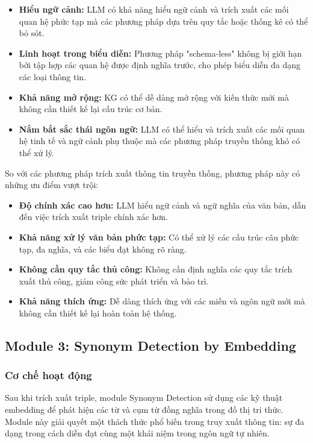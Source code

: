 \begin{itemize}
    \item \textbf{Hiểu ngữ cảnh:} LLM có khả năng hiểu ngữ cảnh và trích xuất các mối quan hệ phức tạp mà các phương pháp dựa trên quy tắc hoặc thống kê có thể bỏ sót.
    
    \item \textbf{Linh hoạt trong biểu diễn:} Phương pháp "schema-less" không bị giới hạn bởi tập hợp các quan hệ được định nghĩa trước, cho phép biểu diễn đa dạng các loại thông tin.
    
    \item \textbf{Khả năng mở rộng:} KG có thể dễ dàng mở rộng với kiến thức mới mà không cần thiết kế lại cấu trúc cơ bản.
    
    \item \textbf{Nắm bắt sắc thái ngôn ngữ:} LLM có thể hiểu và trích xuất các mối quan hệ tinh tế và ngữ cảnh phụ thuộc mà các phương pháp truyền thống khó có thể xử lý.
\end{itemize}

So với các phương pháp trích xuất thông tin truyền thống, phương pháp này có những ưu điểm vượt trội:

\begin{itemize}
    \item \textbf{Độ chính xác cao hơn:} LLM hiểu ngữ cảnh và ngữ nghĩa của văn bản, dẫn đến việc trích xuất triple chính xác hơn.
    
    \item \textbf{Khả năng xử lý văn bản phức tạp:} Có thể xử lý các cấu trúc câu phức tạp, đa nghĩa, và các biểu đạt không rõ ràng.
    
    \item \textbf{Không cần quy tắc thủ công:} Không cần định nghĩa các quy tắc trích xuất thủ công, giảm công sức phát triển và bảo trì.
    
    \item \textbf{Khả năng thích ứng:} Dễ dàng thích ứng với các miền và ngôn ngữ mới mà không cần thiết kế lại hoàn toàn hệ thống.
\end{itemize}

\subsection{Module 3: Synonym Detection by Embedding}

\subsubsection{Cơ chế hoạt động}
Sau khi trích xuất triple, module Synonym Detection sử dụng các kỹ thuật embedding để phát hiện các từ và cụm từ đồng nghĩa trong đồ thị tri thức. Module này giải quyết một thách thức phổ biến trong truy xuất thông tin: sự đa dạng trong cách diễn đạt cùng một khái niệm trong ngôn ngữ tự nhiên.

